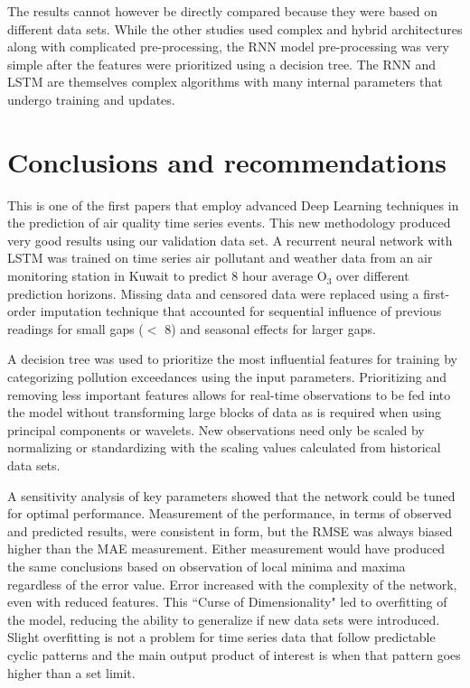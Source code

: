 \begin{linenumbers}
%
The results cannot however be directly compared because they were based on different data sets. While the other studies used complex and hybrid architectures along with complicated pre-processing, the RNN model pre-processing was very simple after the features were prioritized using a decision tree. The RNN and LSTM are themselves complex algorithms with many internal parameters that undergo training and updates.
 
\section{Conclusions and recommendations}
This is one of the first papers that employ advanced Deep Learning techniques in the prediction of air quality time series events. This new methodology produced very good results using our validation data set. A recurrent neural network with LSTM was trained on time series air pollutant and weather data from an air monitoring station in Kuwait to predict 8 hour average O$_{3}$ over different prediction horizons. Missing data and censored data were replaced using a first-order imputation technique that accounted for sequential influence of previous readings for small gaps ($<$ 8) and seasonal effects for larger gaps. 

A decision tree was used to prioritize the most influential features for training by categorizing pollution exceedances using the input parameters. Prioritizing and removing less important features allows for real-time observations to be fed into the model without transforming large blocks of data as is required when using principal components or wavelets. New observations need only be scaled by normalizing or standardizing with the scaling values calculated from historical data sets. 

A sensitivity analysis of key parameters showed that the network could be tuned for optimal performance. Measurement of the performance, in terms of observed and predicted results, were consistent in form, but the RMSE was always biased higher than the MAE measurement. Either measurement would have produced the same conclusions based on observation of local minima and maxima regardless of the error value. Error increased with the complexity of the network, even with reduced features. This ``Curse of Dimensionality" led to overfitting of the model, reducing the ability to generalize if new data sets were introduced. Slight overfitting is not a problem for time series data that follow predictable cyclic patterns and the main output product of interest is when that pattern goes higher than a set limit.


\end{linenumbers}
